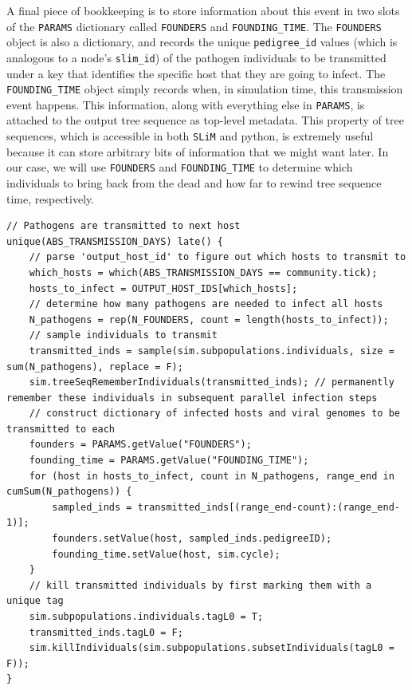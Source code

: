 \documentclass[12pt]{article}
\newcommand{\slim}[0]{\texttt{SLiM}\xspace}
\begin{document}
 A final piece of bookkeeping is to store information about this event in two slots of the \verb|PARAMS| dictionary
called \verb|FOUNDERS| and \verb|FOUNDING_TIME|. The \verb|FOUNDERS| object is also a dictionary, and records the unique \verb|pedigree_id| values (which is analogous to a node's \verb|slim_id|)
of the pathogen individuals to be transmitted under a key that identifies the specific host that they are going to infect. The \verb|FOUNDING_TIME| object simply records when, in
simulation time, this transmission event happens. This information, along with everything else in \verb|PARAMS|, is attached to the output tree sequence as top-level metadata. This property
of tree sequences, which is accessible in both \slim and python, is extremely useful because it can store arbitrary bits of information that we might want later. In our case,
we will use \verb|FOUNDERS| and \verb|FOUNDING_TIME| to determine which individuals to bring back from the dead and how far to rewind tree sequence time, respectively.

\begin{lstlisting}[language=slim, style=slimstyle, breaklines=true]
// Pathogens are transmitted to next host
unique(ABS_TRANSMISSION_DAYS) late() {
	// parse 'output_host_id' to figure out which hosts to transmit to
	which_hosts = which(ABS_TRANSMISSION_DAYS == community.tick);
	hosts_to_infect = OUTPUT_HOST_IDS[which_hosts];
	// determine how many pathogens are needed to infect all hosts
	N_pathogens = rep(N_FOUNDERS, count = length(hosts_to_infect));
	// sample individuals to transmit
	transmitted_inds = sample(sim.subpopulations.individuals, size = sum(N_pathogens), replace = F);
	sim.treeSeqRememberIndividuals(transmitted_inds); // permanently remember these individuals in subsequent parallel infection steps
	// construct dictionary of infected hosts and viral genomes to be transmitted to each
	founders = PARAMS.getValue("FOUNDERS");
	founding_time = PARAMS.getValue("FOUNDING_TIME");
	for (host in hosts_to_infect, count in N_pathogens, range_end in cumSum(N_pathogens)) {
		sampled_inds = transmitted_inds[(range_end-count):(range_end-1)];
		founders.setValue(host, sampled_inds.pedigreeID);
		founding_time.setValue(host, sim.cycle);
	}
	// kill transmitted individuals by first marking them with a unique tag
	sim.subpopulations.individuals.tagL0 = T;
	transmitted_inds.tagL0 = F;
	sim.killIndividuals(sim.subpopulations.subsetIndividuals(tagL0 = F));
}
\end{lstlisting}
\end{document}
